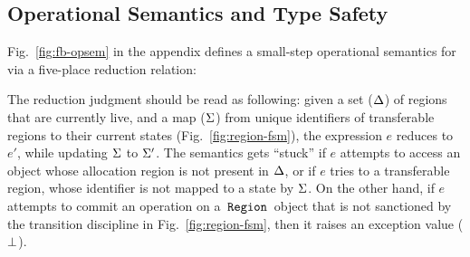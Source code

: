 

\subsection{Operational Semantics and Type Safety}
\label{sec:fb-opsem}

Fig.~\ref{fig:fb-opsem} in the appendix defines a small-step operational semantics for \fbname
via a five-place reduction relation:
\begin{smathpar}
\end{smathpar}
The reduction judgment should be read as following: given a set
($\Delta$) of regions that are currently live, and a map ($\Sigma$)
from unique identifiers of transferable regions to their current
states (Fig.~\ref{fig:region-fsm}), the expression $e$ reduces to
$e'$, while updating $\Sigma$ to $\Sigma'$. The semantics gets
``stuck'' if $e$ attempts to access an object whose allocation region
is not present in $\Delta$, or if $e$ tries to  a
transferable region, whose identifier is not mapped to a state by
$\Sigma$.  On the other hand, if $e$ attempts to commit an operation
on a $\,{\tt Region}\,$ object that is not sanctioned by the transition
discipline in Fig.~\ref{fig:region-fsm}, then it raises an exception
value ($\bot$).

